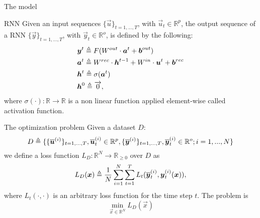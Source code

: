  
\begin{frame}{The model}
	
\begin{block}{RNN}
	Given an input sequences $\{\vec{u}\}_{t=1,...,T}$, with $ \vec{u}_t \in \mathbb{R}^p$, the output sequence of a RNN $\{\vec{y}\}_{t=1,...,T}$, with $\vec{y}_t \in \mathbb{R}^o$,  is defined by the following:
\begin{align}
		&\boldsymbol{y}^t \triangleq F(W^{out}\cdot\boldsymbol{a}^t + \boldsymbol{b}^{out})\\
		&\boldsymbol{a}^t \triangleq W^{rec}\cdot\boldsymbol{h}^{t-1}+W^{in}\cdot\boldsymbol{u}^t+\boldsymbol{b}^{rec}\\
		&\boldsymbol{h}^t \triangleq  \sigma(\boldsymbol{a}^t) \\
		&\boldsymbol{h}^0 \triangleq \overrightarrow{0},
\end{align}
where $\sigma(\cdot):\mathbb{R}\rightarrow\mathbb{R}$ is a non linear function applied element-wise called activation function.
\end{block}
\end{frame}

\begin{frame}{The optimization problem}
Given a dataset $D$:
\begin{equation}
D\triangleq\{\{\overline{\boldsymbol{u}}^{(i)}\}_{t=1,...,T}, \overline{\boldsymbol{u}}^{(i)}_t \in \mathbb{R}^p, \{\overline{\boldsymbol{y}}^{(i)}\}_{t=1,...,T}, \overline{\boldsymbol{y}}^{(i)}_t \in \mathbb{R}^o;  i=1,...,N\}
\end{equation}
we define a loss function $L_D:\mathbb{R}^N \rightarrow \mathbb{R}_{\geq 0}$ over $D$  as
\begin{equation}
L_D(\boldsymbol{x})\triangleq\frac{1}{N}\sum_{i=1}^N \sum_{t=1}^T L_t(\overline{\boldsymbol{y}}_t^{(i)},\boldsymbol{y}_t^{(i)}(\boldsymbol{x})),
\end{equation}
where $L_t(\cdot, \cdot)$ is an arbitrary loss function for the time step $t$.
The problem is \begin{equation}
\min_{\vec{x}\in \mathbb{R}^N} L_D(\vec{x})
\end{equation}
\end{frame}

